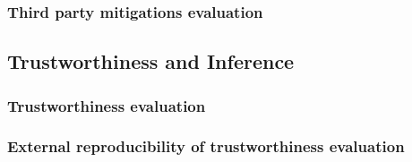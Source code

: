 \documentclass{article}
\begin{document}
\subsubsection{Third party mitigations evaluation}



\subsection{Trustworthiness and Inference}


\subsubsection{Trustworthiness evaluation}
\subsubsection{External reproducibility of trustworthiness evaluation}

\end{document}
